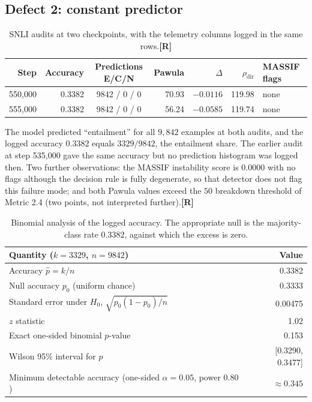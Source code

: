\documentclass[11pt,a4paper]{article}
\newcommand{\sR}{\textbf{[R]}}
\begin{document}
\subsection{Defect 2: constant predictor}
\begin{table}[h]
\centering
\begin{tabular}{@{}rrcrrrl@{}}
\toprule
\textbf{Step} & \textbf{Accuracy} & \textbf{Predictions E/C/N} & \textbf{Pawula} & \textbf{$\Delta$} & \textbf{$\rho_{\text{dir}}$} & \textbf{MASSIF flags}\\
\midrule
550{,}000 & 0.3382 & 9842 / 0 / 0 & 70.93 & $-0.0116$ & 119.98 & none\\
555{,}000 & 0.3382 & 9842 / 0 / 0 & 56.24 & $-0.0585$ & 119.74 & none\\
\bottomrule
\end{tabular}
\caption{SNLI audits at two checkpoints, with the telemetry columns logged in the same rows.\sR{}}
\end{table}
The model predicted ``entailment'' for all $9{,}842$ examples at both audits, and the logged accuracy $0.3382$ equals $3329/9842$, the entailment share. The earlier audit at step 535{,}000 gave the same accuracy but no prediction histogram was logged then. Two further observations: the MASSIF instability score is $0.0000$ with no flags although the decision rule is fully degenerate, so that detector does not flag this failure mode; and both Pawula values exceed the $50$ breakdown threshold of Metric 2.4 (two points, not interpreted further).\sR{}

\begin{table}[h]
\centering
\begin{tabular}{@{}lr@{}}
\toprule
\textbf{Quantity ($k = 3329$, $n = 9842$)} & \textbf{Value}\\
\midrule
Accuracy $\hat p = k/n$ & 0.3382\\
Null accuracy $p_0$ (uniform chance) & 0.3333\\
Standard error under $H_0$, $\sqrt{p_0(1-p_0)/n}$ & 0.00475\\
$z$ statistic & 1.02\\
Exact one-sided binomial $p$-value & 0.153\\
Wilson 95\% interval for $p$ & [0.3290, 0.3477]\\
Minimum detectable accuracy (one-sided $\alpha = 0.05$, power $0.80$) & $\approx 0.345$\\
\bottomrule
\end{tabular}
\caption{Binomial analysis of the logged accuracy. The appropriate null is the majority-class rate $0.3382$, against which the excess is zero.}
\end{table}
\end{document}
